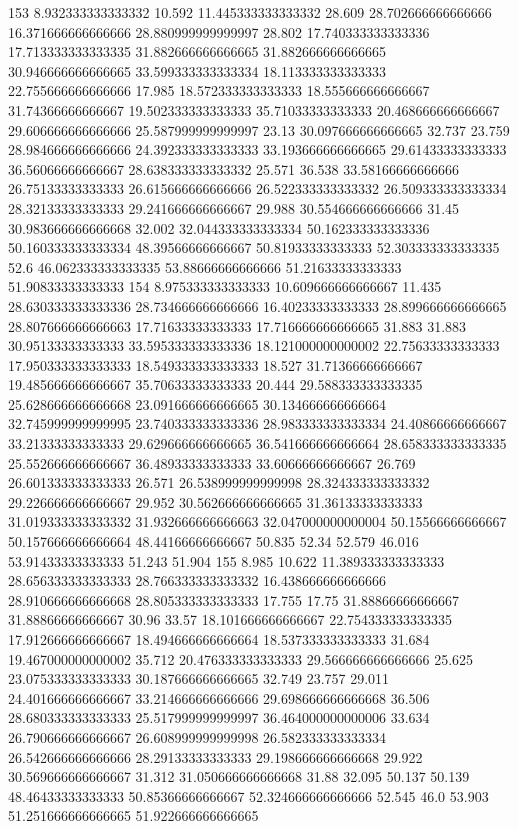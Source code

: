 153 8.932333333333332 10.592 11.445333333333332 28.609 28.702666666666666 16.371666666666666 28.880999999999997 28.802 17.740333333333336 17.713333333333335 31.882666666666665 31.882666666666665 30.946666666666665 33.599333333333334 18.113333333333333 22.755666666666666 17.985 18.572333333333333 18.555666666666667 31.74366666666667 19.502333333333333 35.71033333333333 20.468666666666667 29.606666666666666 25.587999999999997 23.13 30.097666666666665 32.737 23.759 28.984666666666666 24.392333333333333 33.193666666666665 29.61433333333333 36.56066666666667 28.638333333333332 25.571 36.538 33.58166666666666 26.75133333333333 26.615666666666666 26.522333333333332 26.509333333333334 28.32133333333333 29.241666666666667 29.988 30.554666666666666 31.45 30.983666666666668 32.002 32.044333333333334 50.162333333333336 50.160333333333334 48.39566666666667 50.81933333333333 52.303333333333335 52.6 46.062333333333335 53.88666666666666 51.21633333333333 51.90833333333333
154 8.975333333333333 10.609666666666667 11.435 28.630333333333336 28.734666666666666 16.40233333333333 28.899666666666665 28.807666666666663 17.71633333333333 17.716666666666665 31.883 31.883 30.95133333333333 33.595333333333336 18.121000000000002 22.75633333333333 17.950333333333333 18.549333333333333 18.527 31.71366666666667 19.485666666666667 35.70633333333333 20.444 29.588333333333335 25.628666666666668 23.091666666666665 30.134666666666664 32.745999999999995 23.740333333333336 28.983333333333334 24.40866666666667 33.21333333333333 29.629666666666665 36.541666666666664 28.658333333333335 25.552666666666667 36.48933333333333 33.60666666666667 26.769 26.601333333333333 26.571 26.538999999999998 28.324333333333332 29.226666666666667 29.952 30.562666666666665 31.36133333333333 31.019333333333332 31.932666666666663 32.047000000000004 50.15566666666667 50.157666666666664 48.44166666666667 50.835 52.34 52.579 46.016 53.91433333333333 51.243 51.904
155 8.985 10.622 11.389333333333333 28.656333333333333 28.766333333333332 16.438666666666666 28.910666666666668 28.805333333333333 17.755 17.75 31.88866666666667 31.88866666666667 30.96 33.57 18.101666666666667 22.754333333333335 17.912666666666667 18.494666666666664 18.537333333333333 31.684 19.467000000000002 35.712 20.476333333333333 29.566666666666666 25.625 23.075333333333333 30.187666666666665 32.749 23.757 29.011 24.401666666666667 33.214666666666666 29.698666666666668 36.506 28.680333333333333 25.517999999999997 36.464000000000006 33.634 26.790666666666667 26.608999999999998 26.582333333333334 26.542666666666666 28.29133333333333 29.198666666666668 29.922 30.569666666666667 31.312 31.050666666666668 31.88 32.095 50.137 50.139 48.46433333333333 50.85366666666667 52.324666666666666 52.545 46.0 53.903 51.251666666666665 51.922666666666665

